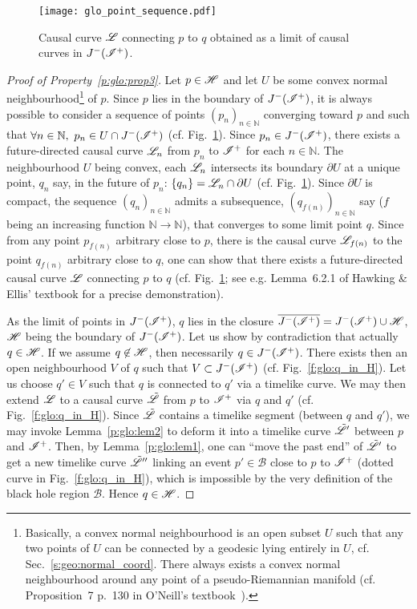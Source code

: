 \begin{figure}
\centerline{\texttt{[image: glo\_point\_sequence.pdf]}}
\caption[]{\label{f:glo:point_sequence} \footnotesize
Causal curve $\mathscr{L}$ connecting $p$ to $q$ obtained as a limit of causal curves
in $J^-(\mathscr{I}^+)$.}
\end{figure}

\begin{proof}[Proof of Property~\ref{p:glo:prop3}]
Let $p\in\mathscr{H}$ and let $U$ be some convex normal neighbourhood\footnote{Basically,
a convex normal neighbourhood is an open subset $U$ such that any two points of $U$
can be connected by a geodesic lying entirely in $U$, cf. Sec.~\ref{s:geo:normal_coord}.
There always exists a convex normal neighbourhood around any point of a pseudo-Riemannian manifold
(cf. Proposition~7 p.~130 in O'Neill's textbook~\cite{ONeil83}).}
of $p$. Since $p$ lies in the boundary of $J^-(\mathscr{I}^+)$, it is always possible to
consider
a sequence of points $(p_n)_{n\in\mathbb{N}}$ converging toward $p$
and such that $\forall n\in\mathbb{N},\ p_n \in U \cap J^-(\mathscr{I}^+)$
(cf. Fig.~\ref{f:glo:point_sequence}).
Since $p_n\in J^-(\mathscr{I}^+)$,
there exists a future-directed causal curve $\mathscr{L}_{n}$ from $p_n$ to $\mathscr{I}^+$
for each $n\in\mathbb{N}$.
The neighbourhood $U$ being convex, each $\mathscr{L}_n$ intersects its boundary $\partial U$
at a unique point, $q_n$ say, in the future of $p_n$: $\{q_n\}=\mathscr{L}_n \cap \partial U$
(cf. Fig.~\ref{f:glo:point_sequence}).
Since $\partial U$
is compact, the sequence $(q_n)_{n\in\mathbb{N}}$ admits a subsequence,
$(q_{f(n)})_{n\in\mathbb{N}}$ say ($f$ being an increasing
function $\mathbb{N}\rightarrow\mathbb{N}$),
that converges to some limit point $q$.
Since from any point $p_{f(n)}$ arbitrary close to $p$, there is
the causal curve $\mathscr{L}_{f(n)}$ to the point $q_{f(n)}$ arbitrary close to $q$,
one can show that
there exists a future-directed causal curve $\mathscr{L}$ connecting $p$ to $q$
(cf. Fig.~\ref{f:glo:point_sequence}; see e.g.
Lemma~6.2.1 of Hawking \& Ellis' textbook \cite{HawkiE73}
for a precise demonstration).

As the limit of points in $J^-(\mathscr{I}^+)$, $q$ lies in the closure
$\overline{J^-(\mathscr{I}^+)} = J^-(\mathscr{I}^+) \cup \mathscr{H}$, $\mathscr{H}$
being the boundary of $J^-(\mathscr{I}^+)$.
Let us show by contradiction that actually $q\in\mathscr{H}$.
If we assume $q\not\in\mathscr{H}$, then necessarily $q\in J^-(\mathscr{I}^+)$.
There exists then an open neighbourhood $V$ of $q$ such that $V \subset  J^-(\mathscr{I}^+)$
(cf. Fig.~\ref{f:glo:q_in_H}).
Let us choose $q'\in V$ such that $q$ is connected to $q'$ via a timelike curve.
We may then extend $\mathscr{L}$ to a causal curve $\tilde{\mathscr{L}}$ from $p$ to $\mathscr{I}^+$
via $q$ and $q'$ (cf. Fig.~\ref{f:glo:q_in_H}). Since $\tilde{\mathscr{L}}$ contains a timelike segment
(between $q$ and $q'$), we may invoke Lemma~\ref{p:glo:lem2} to deform it into
a timelike curve $\tilde{\mathscr{L}}'$ between $p$ and $\mathscr{I}^+$. Then, by Lemma~\ref{p:glo:lem1},
one can ``move the past end'' of $\tilde{\mathscr{L}}'$
to get a new timelike curve $\tilde{\mathscr{L}}''$ linking an event $p'\in\mathscr{B}$ close
to $p$ to $\mathscr{I}^+$ (dotted curve in Fig.~\ref{f:glo:q_in_H}), which is impossible by the very definition of the black hole
region $\mathscr{B}$. Hence $q\in\mathscr{H}$.


\end{proof}
